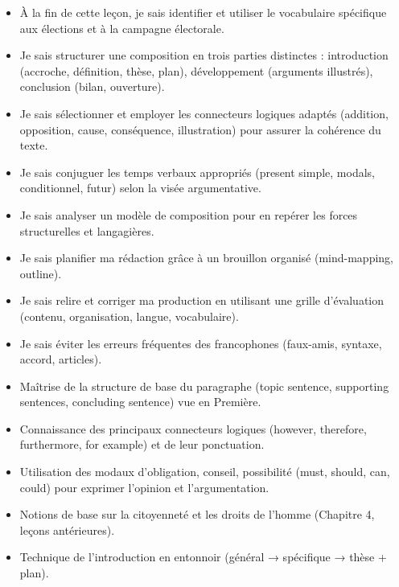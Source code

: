 \documentclass[11pt]{article}
\begin{document}
\begin{objectifs}
\begin{itemize}
\item À la fin de cette leçon, je sais identifier et utiliser le vocabulaire spécifique aux élections et à la campagne électorale.
\item Je sais structurer une composition en trois parties distinctes : introduction (accroche, définition, thèse, plan), développement (arguments illustrés), conclusion (bilan, ouverture).
\item Je sais sélectionner et employer les connecteurs logiques adaptés (addition, opposition, cause, conséquence, illustration) pour assurer la cohérence du texte.
\item Je sais conjuguer les temps verbaux appropriés (present simple, modals, conditionnel, futur) selon la visée argumentative.
\item Je sais analyser un modèle de composition pour en repérer les forces structurelles et langagières.
\item Je sais planifier ma rédaction grâce à un brouillon organisé (mind-mapping, outline).
\item Je sais relire et corriger ma production en utilisant une grille d'évaluation (contenu, organisation, langue, vocabulaire).
\item Je sais éviter les erreurs fréquentes des francophones (faux-amis, syntaxe, accord, articles).
\end{itemize}
\end{objectifs}

\begin{prerequis}
\begin{itemize}
\item Maîtrise de la structure de base du paragraphe (topic sentence, supporting sentences, concluding sentence) vue en Première.
\item Connaissance des principaux connecteurs logiques (however, therefore, furthermore, for example) et de leur ponctuation.
\item Utilisation des modaux d'obligation, conseil, possibilité (must, should, can, could) pour exprimer l'opinion et l'argumentation.
\item Notions de base sur la citoyenneté et les droits de l'homme (Chapitre 4, leçons antérieures).
\item Technique de l'introduction en entonnoir (général → spécifique → thèse + plan).
\end{itemize}
\end{prerequis}
\end{document}
